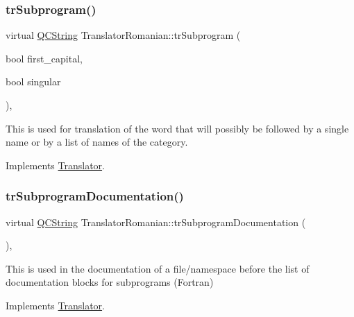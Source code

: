 \subsubsection{\texorpdfstring{trSubprogram()}{trSubprogram()}}
{\footnotesize\ttfamily virtual \mbox{\hyperlink{class_q_c_string}{Q\+C\+String}} Translator\+Romanian\+::tr\+Subprogram (\begin{DoxyParamCaption}\item[{bool}]{first\+\_\+capital,  }\item[{bool}]{singular }\end{DoxyParamCaption})\hspace{0.3cm}{\ttfamily [inline]}, {\ttfamily [virtual]}}

This is used for translation of the word that will possibly be followed by a single name or by a list of names of the category. 

Implements \mbox{\hyperlink{class_translator}{Translator}}.

\mbox{\label{class_translator_romanian_a2628f056b659b8fce1afefba3bf046ac}} 
\subsubsection{\texorpdfstring{trSubprogramDocumentation()}{trSubprogramDocumentation()}}
{\footnotesize\ttfamily virtual \mbox{\hyperlink{class_q_c_string}{Q\+C\+String}} Translator\+Romanian\+::tr\+Subprogram\+Documentation (\begin{DoxyParamCaption}{ }\end{DoxyParamCaption})\hspace{0.3cm}{\ttfamily [inline]}, {\ttfamily [virtual]}}

This is used in the documentation of a file/namespace before the list of documentation blocks for subprograms (Fortran) 

Implements \mbox{\hyperlink{class_translator}{Translator}}.

\mbox{\label{class_translator_romanian_a6f203182dde06072b64fd5968aa99210}} 
